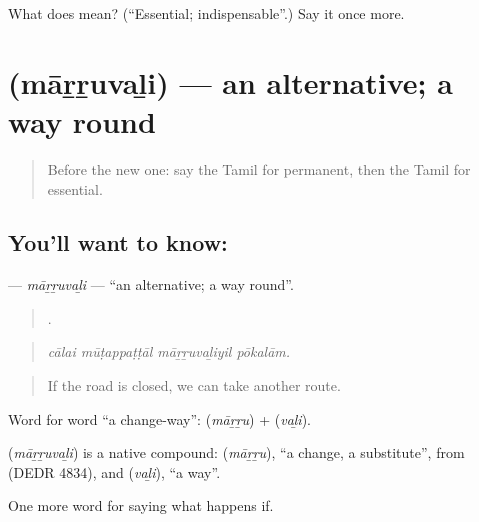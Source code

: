 \begin{tcolorbox}[breakable,colback=teal!4,colframe=teal!35!black,title={Before you move on}]
What does  mean? (\textquotedblleft{}Essential; indispensable\textquotedblright{}.) Say it once more.
\end{tcolorbox}
\section[\texorpdfstring{\ta{மாற்றுவழி} (māṟṟuvaḻi)}{மாற்றுவழி (māṟṟuvaḻi)}]{ (māṟṟuvaḻi) — an alternative; a way round}

\label{lesson:TA-C553-marruvali}



\begin{quote}
Before the new one: say the Tamil for permanent, then the Tamil for essential.
\end{quote}

\subsection*{You'll want to know: }
\textbf{} — \emph{māṟṟuvaḻi} — \textquotedblleft{}an alternative; a way round\textquotedblright{}.

\begin{quote}
   .
\end{quote}

\begin{quote}
\emph{cālai mūṭappaṭṭāl māṟṟuvaḻiyil pōkalām.}
\end{quote}

\begin{quote}
If the road is closed, we can take another route.
\end{quote}

Word for word \textquotedblleft{}a change-way\textquotedblright{}:  (\emph{māṟṟu}) +  (\emph{vaḻi}).

\begin{cousinweb}
\textbf{} (\emph{māṟṟuvaḻi}) is a native compound:  (\emph{māṟṟu}), \textquotedblleft{}a change, a substitute\textquotedblright{}, from  (DEDR 4834), and  (\emph{vaḻi}), \textquotedblleft{}a way\textquotedblright{}.
\end{cousinweb}

\begin{grammarlens}[title={What you've built}]
One more word for saying what happens if.
\end{grammarlens}

